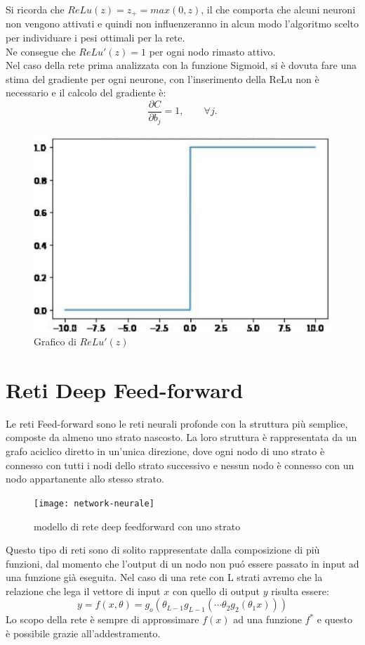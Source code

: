 \documentclass[a4paper,12pt,oneside]{book}
\begin{document}
Si ricorda che $ReLu(z)=z_{+}=max(0,z)$, il che comporta che alcuni neuroni non vengono attivati e quindi non influenzeranno in alcun modo l'algoritmo scelto per individuare i pesi ottimali per la rete.\\
Ne consegue che  $ReLu'(z)=1$ per ogni nodo rimasto attivo.\\
Nel caso della rete prima analizzata con la funzione Sigmoid, si \`e dovuta fare una stima del gradiente per ogni neurone, con l'inserimento della ReLu non \`e necessario e il calcolo del gradiente \`e:
\begin{equation}
\frac{\partial C}{\partial b_j}=1, \qquad \forall j.
\end{equation}
\begin{figure}[!h]
\centering
\caption{Grafico di $ReLu'(z)$}
\includegraphics[scale=1.8]{derivataRelu}
\end{figure}
\newpage
\section{Reti Deep Feed-forward}
Le reti Feed-forward sono le reti neurali profonde con la struttura pi\`{u} semplice, composte da almeno uno strato nascosto. La loro struttura \`e rappresentata da un grafo aciclico diretto in un'unica direzione, dove ogni nodo di uno strato \`e connesso con tutti i nodi dello strato successivo e nessun nodo \`e connesso con un nodo appartanente allo stesso strato.
\begin{figure}[!h]
\centering
\texttt{[image: network-neurale]}
\caption{modello di rete deep feedforward con uno strato}\label{rete}
\end{figure}

Questo tipo di reti sono di solito rappresentate dalla composizione di pi\`{u} funzioni, dal momento che l'output di un nodo non pu\'{o} essere passato in input ad una funzione gi\`{a} eseguita. Nel caso di una rete con L strati avremo che  la relazione che lega il vettore di input $x$ con quello di output $y$ risulta essere:
\begin{equation}
y=f(x,\theta)=g_o(\theta_{L-1}g_{L-1}(\cdots \theta_{2}g_{2}(\theta_{1}x)))
\end{equation}
Lo scopo della rete \`e sempre di approssimare $f(x)$ ad una funzione $f^*$ e questo \`e possibile grazie all'addestramento.
\newpage
\end{document}
